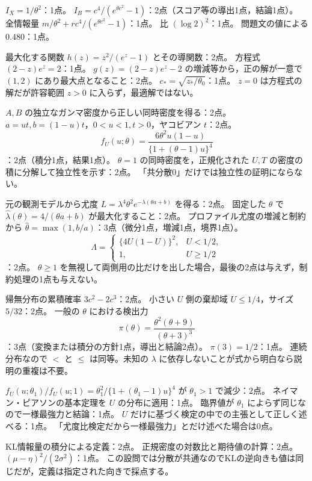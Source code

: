 \documentclass[a4paper,11pt]{ltjsarticle}
\begin{document}
$I_X=1/\theta^2$：1点。
$I_B=c^4/(e^{\theta c^2}-1)$：2点（スコア等の導出1点，結論1点）。
全情報量 $m/\theta^2+rc^4/(e^{\theta c^2}-1)$：1点。
比 $(\log2)^2$：1点。
問題文の値による $0.480$：1点。

最大化する関数 $h(z)=z^2/(e^z-1)$ とその導関数：2点。
方程式 $(2-z)e^z=2$：1点。
$g(z)=(2-z)e^z-2$ の増減等から，正の解が一意で $(1,2)$ にあり最大点となること：2点。
$c_*=\sqrt{z_*/\theta_0}$：1点。
$z=0$ は方程式の解だが許容範囲 $z>0$ に入らず，最適解ではない。
\newpage

$A,B$ の独立なガンマ密度から正しい同時密度を得る：2点。
$a=ut,b=(1-u)t$，$0<u<1,t>0$，ヤコビアン $t$：2点。
\[
f_U(u;\theta)=\frac{6\theta^2u(1-u)}{\{1+(\theta-1)u\}^4}
\]
：2点（積分1点，結果1点）。
$\theta=1$ の同時密度を，正規化された $U,T$ の密度の積に分解して独立性を示す：2点。
「共分散0」だけでは独立性の証明にならない。

元の観測モデルから尤度 $L=\lambda^4\theta^2e^{-\lambda(\theta a+b)}$ を得る：2点。
固定した $\theta$ で $\hat\lambda(\theta)=4/(\theta a+b)$ が最大化すること：2点。
プロファイル尤度の増減と制約から $\hat\theta=\max(1,b/a)$：3点（微分1点，増減1点，境界1点）。
\[
\Lambda=\begin{cases}\{4U(1-U)\}^2,&U<1/2,\\1,&U\geq1/2\end{cases}
\]
：2点。
$\theta\geq1$ を無視して両側用の比だけを出した場合，最後の2点は与えず，制約処理の1点も与えない。

帰無分布の累積確率 $3c^2-2c^3$：2点。
小さい $U$ 側の棄却域 $U\leq1/4$，サイズ $5/32$：2点。
一般の $\theta$ における検出力
\[
\pi(\theta)=\frac{\theta^2(\theta+9)}{(\theta+3)^3}
\]
：3点（変換または積分の方針1点，導出と結論2点）。
$\pi(3)=1/2$：1点。
連続分布なので $<$ と $\leq$ は同等。未知の $\lambda$ に依存しないことが式から明白なら説明の重複は不要。

$f_U(u;\theta_1)/f_U(u;1)=\theta_1^2/\{1+(\theta_1-1)u\}^4$ が $\theta_1>1$ で減少：2点。
ネイマン・ピアソンの基本定理を $U$ の分布に適用：1点。
臨界値が $\theta_1$ によらず同じなので一様最強力と結論：1点。
$U$ だけに基づく検定の中での主張として正しく述べる：1点。
「尤度比検定だから一様最強力」とだけ述べた場合は0点。
\newpage

KL情報量の積分による定義：2点。
正規密度の対数比と期待値の計算：2点。
$(\mu-\eta)^2/(2\sigma^2)$：1点。
この設問では分散が共通なのでKLの逆向きも値は同じだが，定義は指定された向きで採点する。
\end{document}
